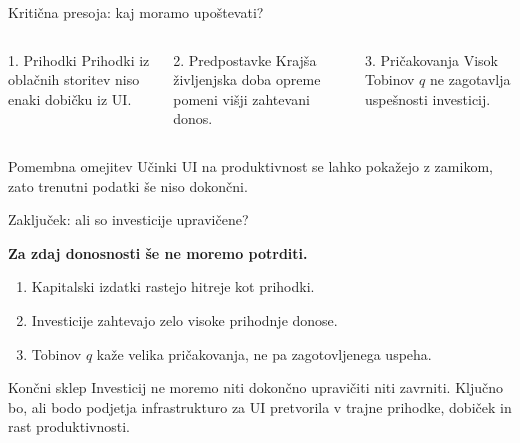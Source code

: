 \documentclass[aspectratio=169,11pt]{beamer}
\begin{document}
\begin{frame}{Kritična presoja: kaj moramo upoštevati?}

\begin{columns}[T]
    \begin{block}{1. Prihodki}
        Prihodki iz oblačnih storitev niso enaki dobičku iz UI.
    \end{block}

    \begin{block}{2. Predpostavke}
        Krajša življenjska doba opreme pomeni višji zahtevani donos.
    \end{block}

    \begin{block}{3. Pričakovanja}
        Visok Tobinov $q$ ne zagotavlja uspešnosti investicij.
    \end{block}
\end{columns}

\vspace{0.45cm}

\begin{alertblock}{Pomembna omejitev}
Učinki UI na produktivnost se lahko pokažejo z zamikom, zato trenutni podatki še niso dokončni.
\end{alertblock}

\end{frame}


\begin{frame}{Zaključek: ali so investicije upravičene?}

\begin{center}
    \Large
    \textbf{Za zdaj donosnosti še ne moremo potrditi.}
\end{center}

\vspace{0.35cm}

\begin{enumerate}
    \item Kapitalski izdatki rastejo hitreje kot prihodki.
    \item Investicije zahtevajo zelo visoke prihodnje donose.
    \item Tobinov $q$ kaže velika pričakovanja, ne pa zagotovljenega uspeha.
\end{enumerate}

\vspace{0.4cm}

\begin{block}{Končni sklep}
Investicij ne moremo niti dokončno upravičiti niti zavrniti. Ključno bo, ali bodo podjetja infrastrukturo za UI pretvorila v trajne prihodke, dobiček in rast produktivnosti.
\end{block}

\end{frame}
\end{document}
